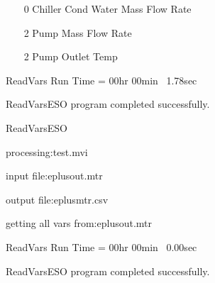 ~~~~ 0 Chiller Cond Water Mass Flow Rate

~~~~ 2 Pump Mass Flow Rate

~~~~ 2 Pump Outlet Temp

~ReadVars Run Time = 00hr 00min~ 1.78sec

~ReadVarsESO program completed successfully.

~ReadVarsESO

~processing:test.mvi

~input file:eplusout.mtr

~output file:eplusmtr.csv

~getting all vars from:eplusout.mtr

~ReadVars Run Time = 00hr 00min~ 0.00sec

~ReadVarsESO program completed successfully.
